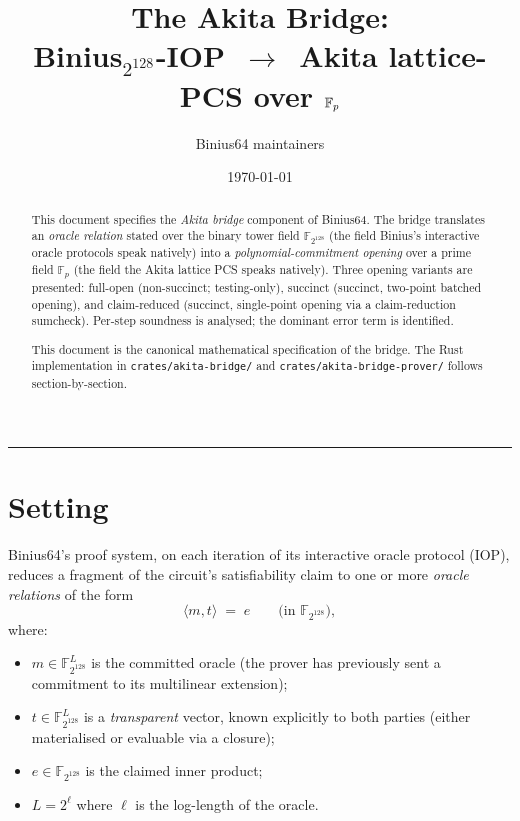 \documentclass[11pt,a4paper]{article}
\title{The Akita Bridge:\\
\large Binius$_{2^{128}}$-IOP $\,\to\,$ Akita lattice-PCS over $\mathbb{F}_p$}
\author{Binius64 maintainers}
\date{\today}
\theoremstyle{definition}
\theoremstyle{remark}
\newcommand{\binF}{\mathbb{F}_{2^{128}}}        %
\newcommand{\akF}{\mathbb{F}_{p}}                %
\newcommand{\Transparent}{t}                      %
\newcommand{\Message}{m}                          %
\begin{document}
\maketitle

\begin{abstract}
This document specifies the \emph{Akita bridge} component of Binius64.
The bridge translates an \emph{oracle relation} stated over the binary
tower field $\binF$ (the field Binius's interactive oracle protocols
speak natively) into a \emph{polynomial-commitment opening} over a prime
field $\akF$ (the field the Akita lattice PCS speaks natively). Three
opening variants are presented: \textsf{full-open} (non-succinct;
testing-only), \textsf{succinct} (succinct, two-point batched opening),
and \textsf{claim-reduced} (succinct, single-point opening via a
claim-reduction sumcheck). Per-step soundness is analysed; the dominant
error term is identified.

This document is the canonical mathematical specification of the
bridge. The Rust implementation in
\verb|crates/akita-bridge/| and
\verb|crates/akita-bridge-prover/| follows section-by-section.
\end{abstract}

\tableofcontents

\bigskip\hrule\bigskip


\section{Setting}
\label{sec:setting}

Binius64's proof system, on each iteration of its interactive oracle
protocol (IOP), reduces a fragment of the circuit's satisfiability claim
to one or more \emph{oracle relations} of the form
\[
  \langle \Message, \Transparent \rangle \;=\; e
  \qquad \text{(in } \binF \text{)},
\]
where:

\begin{itemize}[leftmargin=*, itemsep=2pt]
  \item $\Message \in \binF^{L}$ is the committed oracle (the prover
        has previously sent a commitment to its multilinear extension);
  \item $\Transparent \in \binF^{L}$ is a \emph{transparent} vector,
        known explicitly to both parties (either materialised or
        evaluable via a closure);
  \item $e \in \binF$ is the claimed inner product;
  \item $L = 2^{\ell}$ where $\ell$ is the log-length of the oracle.
\end{itemize}
\end{document}
